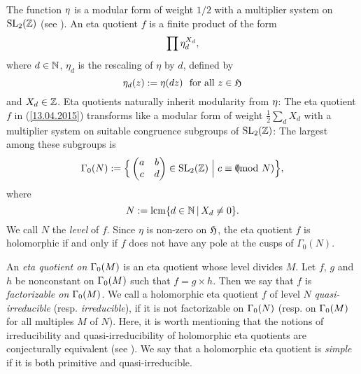 \documentclass[a4paper,11pt]{amsart}
\begin{document}
The function $\eta$ is a modular form
of weight $1/2$ with a multiplier system %
on $\operatorname{SL}_2(\mathbb{Z})$ (see \cite{b}).
An %
eta quotient $f$ is a finite product of the form 
\begin{equation}
 \prod\eta_d^{X_d},
\label{13.04.2015}\end{equation}
where $d\in\mathbb{N}$, $\eta_d$ is the rescaling of $\eta$ by $d$, defined by
\begin{equation}
 \eta_d(z):=\eta(dz) \ \text{ for all $z\in\mathfrak{H}$}
\end{equation}
and $X_d\in\mathbb{Z}$.
Eta quotients naturally inherit modularity %
from $\eta$: The eta quotient $f$ in (\ref{13.04.2015}) transforms like a modular form of
weight $\frac12\sum_dX_d$ with a multiplier system on suitable congruence subgroups of $\operatorname{SL}_2(\mathbb{Z})$: 
The largest among
these subgroups is 
\begin{equation}
 \Gm_0(N):=\Big{\{}\begin{pmatrix}a&b\\ c&d\end{pmatrix}\in
\operatorname{SL}_2(\Z)\hspace{3pt}\Big{|}\hspace{3pt} c\equiv0\hspace*{-.3cm}\pmod N\Big{\}},
\end{equation}
where 
\begin{equation}
 N:=\operatorname{lcm}\{d\in\N\hs\idi\hs X_d\neq0\}.
\end{equation}
We call $N$ the \emph{level} of $f$.
Since $\eta$ is non-zero on $\mathfrak{H}$, %
the eta quotient $f$ %
is holomorphic if and only if $f$ does not have any pole at the cusps of 
$\Gamma_0(N)$.

An \emph{eta quotient %
on $\Gamma_0(M)$} is
an eta quotient whose level divides $M$.
Let $f$, $g$ and $h$ be nonconstant \hes on $\Gamma_0(M)$
such that 
$f=g\times h$. Then we say that $f$ is \emph{factorizable on} $\Gamma_0(M)$. %
We call a holomorphic eta quotient $f$ of level $N$ \emph{quasi-irreducible} (resp. \emph{irreducible}),
if it is not factorizable on $\Gamma_0(N)$ (resp. on $\Gamma_0(M)$ for all multiples $M$ of $N$).
Here, it is worth mentioning that the notions of irreducibility and quasi-irreducibility of holomorphic 
eta quotients are conjecturally equivalent (see \cite{B-three}).
We say that a holomorphic eta quotient is \emph{simple} if it is 
 both primitive and quasi-irreducible.
 
\end{document}
